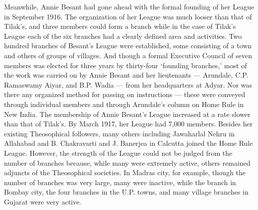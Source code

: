 Meanwhile, Annie Besant had gone ahead with the formal founding of her League in September 1916. The organization of her League was much looser than that of Tilak's, and three members could form a branch while in the case of Tilak's League each of the six branches had a clearly defined area and activities. Two hundred branches of Besant's League were established, some consisting of a town and others of groups of villages. And though a formal Executive Council of seven members was elected for three years by thirty-four `founding branches,' most of the work was carried on by Annie Besant and her lieutenants --- Arundale, C.P. Ramaswamy Aiyar, and B.P. Wadia --- from her headquarters at Adyar. Nor was there any organized method for passing on instructions --- these were conveyed through individual members and through Arundale's column on Home Rule in New India. The membership of Annie Besant's League increased at a rate slower than that of Tilak's. By March 1917, her League had 7,000 members. Besides her existing Theosophical followers, many others including Jawaharlal Nehru in Allahabad and B. Chakravarti and J. Banerjea in Calcutta joined the Home Rule League. However, the strength of the League could not be judged from the number of branches because, while many were extremely active, others remained adjuncts of the Theosophical societies. In Madras city, for example, though the number of branches was very large, many were inactive, while the branch in Bombay city, the four branches in the U.P. towns, and many village branches in Gujarat were very active.

